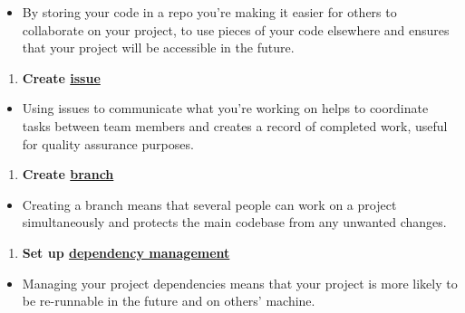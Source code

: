 \documentclass[]{book}
\providecommand{\tightlist}{%
  \setlength{\itemsep}{0pt}\setlength{\parskip}{0pt}}
\begin{document}
\begin{itemize}
\tightlist
\item
  By storing your code in a repo you're making it easier for others to collaborate on your project, to use pieces of your code elsewhere and ensures that your project will be accessible in the future.
\end{itemize}

\begin{enumerate}
\def\labelenumi{\arabic{enumi}.}
\setcounter{enumi}{1}
\tightlist
\item
  \textbf{Create \protect\hyperlink{versioncontrol}{issue}}\\
\end{enumerate}

\begin{itemize}
\tightlist
\item
  Using issues to communicate what you're working on helps to coordinate tasks between team members and creates a record of completed work, useful for quality assurance purposes.
\end{itemize}

\begin{enumerate}
\def\labelenumi{\arabic{enumi}.}
\setcounter{enumi}{2}
\tightlist
\item
  \textbf{Create \protect\hyperlink{versioncontrol}{branch}}\\
\end{enumerate}

\begin{itemize}
\tightlist
\item
  Creating a branch means that several people can work on a project simultaneously and protects the main codebase from any unwanted changes.\\
\end{itemize}

\begin{enumerate}
\def\labelenumi{\arabic{enumi}.}
\setcounter{enumi}{3}
\tightlist
\item
  \textbf{Set up \protect\hyperlink{projdep}{dependency management}}\\
\end{enumerate}

\begin{itemize}
\tightlist
\item
  Managing your project dependencies means that your project is more likely to be re-runnable in the future and on others' machine.\\
\end{itemize}
\end{document}
